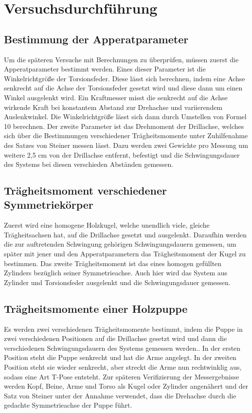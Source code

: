 \documentclass[titlepage = firstcover]{scrartcl}
\begin{document}
    \section{Versuchsdurchführung}
      \subsection{Bestimmung der Apperatparameter}
      Um die späteren Versuche mit Berechnungen zu überprüfen, müssen zuerst die Apperatparameter bestimmt werden. Eines dieser Parameter ist die Winkelrichtgröße 
      der Torsionsfeder. Diese lässt sich berechnen, indem eine Achse senkrecht auf die Achse der Torsionsfeder gesetzt wird und diese dann um einen Winkel
      ausgelenkt wird. Ein Kraftmesser misst die senkrecht auf die Achse wirkende Kraft bei konstantem Abstand zur Drehachse und variierendem Auslenkwinkel. Die 
      Winkelrichtgröße lässt sich dann durch Umstellen von Formel 10 berechnen. Der zweite Parameter ist das Drehmoment der Drillachse, welches sich über 
      die Bestimmungen verschiedener Trägheitsmomente unter Zuhilfenahme des Satzes von Steiner messen lässt. Dazu werden zwei Gewichte pro Messung um weitere 2,5 cm von 
      der  Drillachse entfernt, befestigt und die Schwingungsdauer des Systems bei diesen verschieden Abständen gemessen.

      \subsection{Trägheitsmoment verschiedener Symmetriekörper}
      Zuerst wird eine homogene Holzkugel, welche unendlich viele, gleiche Trägheitsachsen hat, auf die Drillachse gesetzt und ausgelenkt. Daraufhin werden die 
      zur auftretenden Schwingung gehörigen Schwingungsdauern gemessen, um später mit jener und den Apperatparametern das Trägheitsmoment der Kugel zu bestimmen.
      Das zweite Trägheitsmoment ist das eines homogen gefüllten Zylinders bezüglich seiner Symmetrieachse. Auch hier wird das System aus Zylinder und Torsionsfeder
      ausgelenkt und die Schwingungsdauer gemessen.

      \subsection{Trägheitsmomente einer Holzpuppe}
      Es werden zwei verschiedenen Trägheitsmomente bestimmt, indem die Puppe in zwei verschiedenen Positionen auf die Drillachse gesetzt wird und dann die verschiedenen
      Schwingungsdauern des Systems gemessen werden.. In der ersten Position steht die Puppe senkrecht und hat die Arme angelegt. In der zweiten Position steht sie wieder 
      senkrecht, aber streckt die Arme nun rechtwinklig aus, sodass eine Art T-Pose entsteht. Zur späteren Verifizierung der Messergebnisse werden Kopf, Beine, Arme
      und Torso als Kugel oder Zylinder angenähert und der Satz von Steiner unter der Annahme verwendet, dass die Drehachse durch die gedachte Symmetrieachse der
      Puppe führt.
\end{document}
